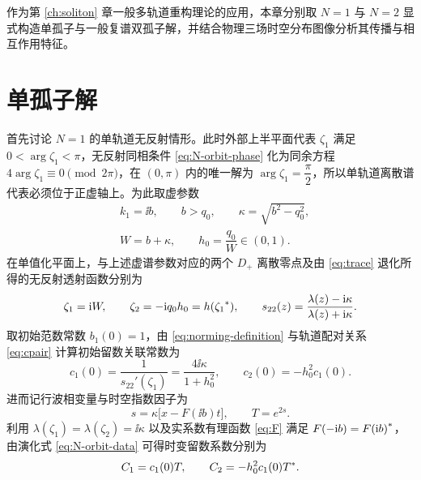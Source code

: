
作为第 \ref{ch:soliton} 章一般多轨道重构理论的应用，本章分别取 $N=1$ 与 $N=2$ 显式构造单孤子与一般复谱双孤子解\cite{ZhangFan2020}，并结合物理三场时空分布图像分析其传播与相互作用特征。

\section{单孤子解}

首先讨论 $N=1$ 的单轨道无反射情形。此时外部上半平面代表 $\zeta_1$ 满足 $0<\arg\zeta_1<\pi$，无反射同相条件 \eqref{eq:N-orbit-phase} 化为同余方程 $4\arg\zeta_1\equiv0\pmod{2\pi}$，在 $(0,\pi)$ 内的唯一解为 $\arg\zeta_1=\dfrac{\pi}{2}$，所以单轨道离散谱代表必须位于正虚轴上。为此取虚参数
\begin{equation}\label{eq:imaginarypoint}
\begin{aligned}
&k_1=\ii b,\qquad b>q_0,\qquad \kappa=\sqrt{b^2-q_0^2},\\
&W=b+\kappa,\qquad h_0=\dfrac{q_0}{W}\in(0,1).
\end{aligned}
\end{equation}
在单值化平面上，与上述虚谱参数对应的两个 $D_+$ 离散零点及由 \eqref{eq:trace} 退化所得的无反射透射函数分别为
\begin{equation}\label{eq:onezeros}
\zeta_1=\mathrm{i} W,\qquad \zeta_2=-\mathrm{i} q_0h_0=h({\zeta_1}^{*}),\qquad
s_{22}(z)=\dfrac{\lambda(z)-\mathrm{i}\kappa}{\lambda(z)+\mathrm{i}\kappa}.
\end{equation}
取初始范数常数 $b_1(0)=1$，由 \eqref{eq:norming-definition} 与轨道配对关系 \eqref{eq:cpair} 计算初始留数关联常数为
\begin{equation}\label{eq:onec}
c_1(0)=\dfrac{1}{s_{22}'(\zeta_1)}=\dfrac{4\ii\kappa}{1+h_0^2},\qquad
c_2(0)=-h_0^2c_1(0).
\end{equation}
进而记行波相变量与时空指数因子为
\begin{equation*}
s=\kappa\bigl[x-F(\ii b)t\bigr],\qquad
T=e^{2s}.
\end{equation*}
利用 $\lambda(\zeta_1)=\lambda(\zeta_2)=\ii\kappa$ 以及实系数有理函数 \eqref{eq:F} 满足 $F(-\mathrm{i} b)={F(\mathrm{i} b)}^{*}$，由演化式 \eqref{eq:N-orbit-data} 可得时变留数系数分别为
\begin{equation*}
C_1=c_1(0)T,\qquad C_2=-h_0^2c_1(0){T}^{*}.
\end{equation*}

